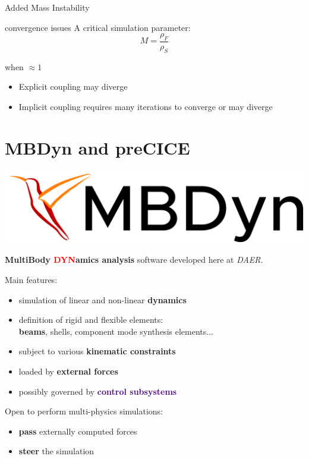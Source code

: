 \documentclass[10pt,t]{beamer}
\begin{document}
\begin{frame}{Added Mass Instability}

\begin{alertblock}{convergence issues}
A critical simulation parameter:
\begin{equation}
    M = \frac{\rho_F}{\rho_S}
\end{equation}

when $\approx 1$

\end{alertblock}

    \begin{itemize}
        \item Explicit coupling may diverge
        \item Implicit coupling requires many iterations to converge or may diverge 
    \end{itemize}
\end{frame}




\section{MBDyn and preCICE}

\begin{frame}{\includegraphics[width=.18\textwidth]{images/mbdyn.png}}

\textbf{\textcolor{dorange}{M}ulti\textcolor{dorange}{B}ody \textcolor{red}{DYN}amics analysis} software developed here at \textit{DAER}.\\


\vspace{5mm}

Main features:

    \begin{itemize}
        \item simulation of linear and non-linear \textbf{\textcolor{dorange}{dynamics}}
        \item definition of rigid and flexible elements:\\ \textbf{\textcolor{dblue}{beams}}, shells, component mode synthesis elements...
        \item subject to various \textbf{\textcolor{pblue}{kinematic constraints}}
        \item loaded by \textbf{\textcolor{fgreen}{external forces}}
        \item possibly governed by \textbf{\textcolor{indigo}{control subsystems}}
    \end{itemize}

\pause
\vspace{5mm}

Open to perform multi-physics simulations:
\begin{itemize}
    \item \textbf{pass} externally computed forces
    \item \textbf{steer} the simulation
\end{itemize}

\end{frame}
\end{document}
